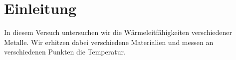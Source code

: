 
\section{Einleitung}

In diesem Versuch untersuchen wir die Wärmeleitfähigkeiten verschiedener
Metalle. Wir erhitzen dabei verschiedene Materialien und messen an
verschiedenen Punkten die Temperatur.
